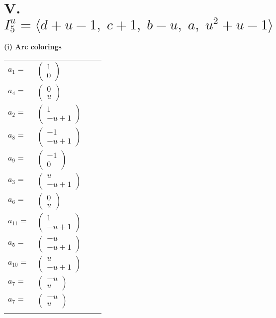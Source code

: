 \documentclass[1p]{elsarticle_modified}
\theoremstyle{definition}
\begin{document}
\centering \section*{V. $I^u_{5}= \langle d+u-1,\;c+1,\;b- u,\;a,\;u^2+u-1 \rangle$}
\flushleft \textbf{(i) Arc colorings}\\
\begin{tabular}{m{7pt} m{180pt} m{7pt} m{180pt} }
\flushright $a_{1}=$&$\begin{pmatrix}1\\0\end{pmatrix}$ \\
\flushright $a_{4}=$&$\begin{pmatrix}0\\u\end{pmatrix}$ \\
\flushright $a_{2}=$&$\begin{pmatrix}1\\- u+1\end{pmatrix}$ \\
\flushright $a_{8}=$&$\begin{pmatrix}-1\\- u+1\end{pmatrix}$ \\
\flushright $a_{9}=$&$\begin{pmatrix}-1\\0\end{pmatrix}$ \\
\flushright $a_{3}=$&$\begin{pmatrix}u\\- u+1\end{pmatrix}$ \\
\flushright $a_{6}=$&$\begin{pmatrix}0\\u\end{pmatrix}$ \\
\flushright $a_{11}=$&$\begin{pmatrix}1\\- u+1\end{pmatrix}$ \\
\flushright $a_{5}=$&$\begin{pmatrix}- u\\- u+1\end{pmatrix}$ \\
\flushright $a_{10}=$&$\begin{pmatrix}u\\- u+1\end{pmatrix}$ \\
\flushright $a_{7}=$&$\begin{pmatrix}- u\\u\end{pmatrix}$\\ \flushright $a_{7}=$&$\begin{pmatrix}- u\\u\end{pmatrix}$\\&\end{tabular}
\end{document}
